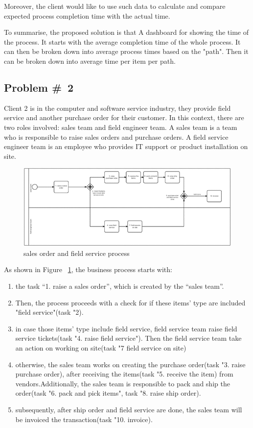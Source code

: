 Moreover, the client would like to use such data to calculate and compare expected process completion time with the actual time. 

To summarise, the proposed solution is that A dashboard for showing the time of the process. It starts with the average completion time of the whole process. It can then be broken down into average process times based on the "path". Then it can be broken down into average time per item per path.

\subsection{Problem \#~2}

Client 2 is in the computer and software service industry, they provide field service and another purchase order for their customer. In this context, there are two roles involved: sales team and field engineer team. A sales team is a team who is responsible to raise sales orders and purchase orders. A field service engineer team is an employee who provides IT support or product installation on site. 

\begin{figure}[!htb]
    \centering 
    \includegraphics[scale=0.7]{resource/soAndFieldService.png}
    \caption{sales order and field service process}
    \label{figure:soAndfieldservice}
\end{figure}

As shown in Figure ~\ref{figure:soAndfieldservice}, the business process starts with:
\begin{enumerate}
    \item the task “1. raise a sales order”, which is created by the “sales team”. 
    \item Then, the process proceeds with a check for if these items' type are included "field service"(task "2). 
    \item in case those items' type include field service, field service team raise field service tickets(task "4. raise field service"). Then the field service team take an action on working on site(task "7 field service on site)
    \item otherwise, the sales team works on creating the purchase order(task "3. raise purchase order), after receiving the items(task "5. receive the item) from vendors.Additionally, the sales team is responsible to pack and ship the order(task "6. pack and pick items", task "8. raise ship order).
    \item subsequently, after ship order and field service are done, the sales team will be invoiced the transaction(task "10. invoice).
\end{enumerate}



